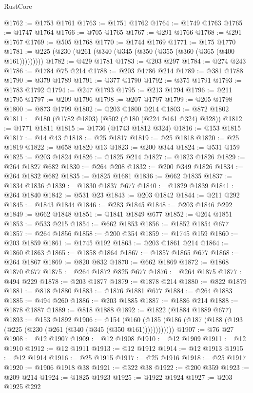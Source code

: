 \begin{lexlean}{RustCore}
\begin{coremodule}
@1762 := @1753 @1761
@1763 := @1751 @1762
@1764 := @1749 @1763
@1765 := @1747 @1764
@1766 := @705 @1765
@1767 := @291 @1766
@1768 := @291 @1767
@1769 := @505 @1768
@1770 := @1744 @1769
@1771 := @175 @1770
@1781 := @225 (@230 (@261 (@340 (@345 (@350 (@355 (@360 (@365 (@400 @161)))))))))
@1782 := @429 @1781
@1783 := @203 @297
@1784 := @274 @243
@1786 := @1784 @75 @214
@1788 := @203 @1786 @214
@1789 := @381 @1788
@1790 := @379 @1789
@1791 := @377 @1790
@1792 := @375 @1791
@1793 := @1783 @1792
@1794 := @247 @1793
@1795 := @213 @1794
@1796 := @211 @1795
@1797 := @209 @1796
@1798 := @207 @1797
@1799 := @205 @1798
@1800 := @873 @1799
@1802 := @203 @1800 @214
@1803 := @872 @1802
@1811 := @180 (@1782 @1803) (@502 (@180 (@224 @161 @324) @328))
@1812 := @1771 @1811
@1815 := @1736 (@1743 @1812 @324)
@1816 := @153 @1815
@1817 := @14 @43
@1818 := @25 @1817
@1819 := @25 @1818
@1820 := @25 @1819
@1822 := @658 @1820 @13
@1823 := @200 @344
@1824 := @531 @159
@1825 := @203 @1824
@1826 := @1825 @214
@1827 := @1823 @1826
@1829 := @264 @1827 @682
@1830 := @264 @208
@1832 := @200 @349 @1826
@1834 := @264 @1832 @682
@1835 := @1825 @1681
@1836 := @662 @1835
@1837 := @1834 @1836
@1839 := @1830 @1837 @677
@1840 := @1829 @1839
@1841 := @264 @1840
@1842 := @531 @23
@1843 := @203 @1842
@1844 := @211 @292
@1845 := @1843 @1844
@1846 := @283 @1845
@1848 := @203 @1846 @292
@1849 := @662 @1848
@1851 := @1841 @1849 @677
@1852 := @264 @1851
@1853 := @533 @215
@1854 := @662 @1853
@1856 := @1852 @1854 @677
@1857 := @264 @1856
@1858 := @200 @354
@1859 := @1745 @159
@1860 := @203 @1859
@1861 := @1745 @192
@1863 := @203 @1861 @214
@1864 := @1860 @1863
@1865 := @1858 @1864
@1867 := @1857 @1865 @677
@1868 := @264 @1867
@1869 := @820 @832
@1870 := @662 @1869
@1872 := @1868 @1870 @677
@1875 := @264 @1872 @825 @677
@1876 := @264 @1875
@1877 := @494 @229
@1878 := @203 @1877
@1879 := @1878 @214
@1880 := @822 @1879
@1881 := @818 @1880
@1883 := @1876 @1881 @677
@1884 := @264 @1883
@1885 := @494 @260
@1886 := @203 @1885
@1887 := @1886 @214
@1888 := @1878 @1887
@1889 := @818 @1888
@1892 := @1822 (@1884 @1889 @677)
@1893 := @153 @1892
@1906 := @154
    (@160 (@185 (@186 (@187 (@188 (@193 (@225 (@230 (@261 (@340 (@345 (@350 @161))))))))))))
@1907 := @76 @27
@1908 := @12 @1907
@1909 := @12 @1908
@1910 := @12 @1909
@1911 := @12 @1910
@1912 := @12 @1911
@1913 := @12 @1912
@1914 := @12 @1913
@1915 := @12 @1914
@1916 := @25 @1915
@1917 := @25 @1916
@1918 := @25 @1917
@1920 := @1906 @1918 @38
@1921 := @322 @38
@1922 := @200 @359
@1923 := @209 @214
@1924 := @1825 @1923
@1925 := @1922 @1924
@1927 := @203 @1925 @292

\end{coremodule}
\end{lexlean}
